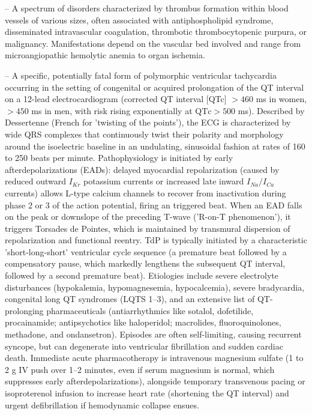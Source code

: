 -- A spectrum of disorders characterized by thrombus formation within blood vessels of various sizes, often associated with antiphospholipid syndrome, disseminated intravascular coagulation, thrombotic thrombocytopenic purpura, or malignancy. Manifestations depend on the vascular bed involved and range from microangiopathic hemolytic anemia to organ ischemia.

-- A specific, potentially fatal form of polymorphic ventricular tachycardia occurring in the setting of congenital or acquired prolongation of the QT interval on a 12-lead electrocardiogram (corrected QT interval [QTc] $>460$ ms in women, $>450$ ms in men, with risk rising exponentially at $\text{QTc} > 500$ ms). Described by Dessertenne (French for 'twisting of the points'), the ECG is characterized by wide QRS complexes that continuously twist their polarity and morphology around the isoelectric baseline in an undulating, sinusoidal fashion at rates of 160 to 250 beats per minute. Pathophysiology is initiated by early afterdepolarizations (EADs): delayed myocardial repolarization (caused by reduced outward $I_{Kr}$ potassium currents or increased late inward $I_{Na}/I_{Ca}$ currents) allows L-type calcium channels to recover from inactivation during phase 2 or 3 of the action potential, firing an triggered beat. When an EAD falls on the peak or downslope of the preceding T-wave ('R-on-T phenomenon'), it triggers Torsades de Pointes, which is maintained by transmural dispersion of repolarization and functional reentry. TdP is typically initiated by a characteristic 'short-long-short' ventricular cycle sequence (a premature beat followed by a compensatory pause, which markedly lengthens the subsequent QT interval, followed by a second premature beat). Etiologies include severe electrolyte disturbances (hypokalemia, hypomagnesemia, hypocalcemia), severe bradycardia, congenital long QT syndromes (LQTS 1--3), and an extensive list of QT-prolonging pharmaceuticals (antiarrhythmics like sotalol, dofetilide, procainamide; antipsychotics like haloperidol; macrolides, fluoroquinolones, methadone, and ondansetron). Episodes are often self-limiting, causing recurrent syncope, but can degenerate into ventricular fibrillation and sudden cardiac death. Immediate acute pharmacotherapy is intravenous magnesium sulfate (1 to 2 g IV push over 1--2 minutes, even if serum magnesium is normal, which suppresses early afterdepolarizations), alongside temporary transvenous pacing or isoproterenol infusion to increase heart rate (shortening the QT interval) and urgent defibrillation if hemodynamic collapse ensues.


